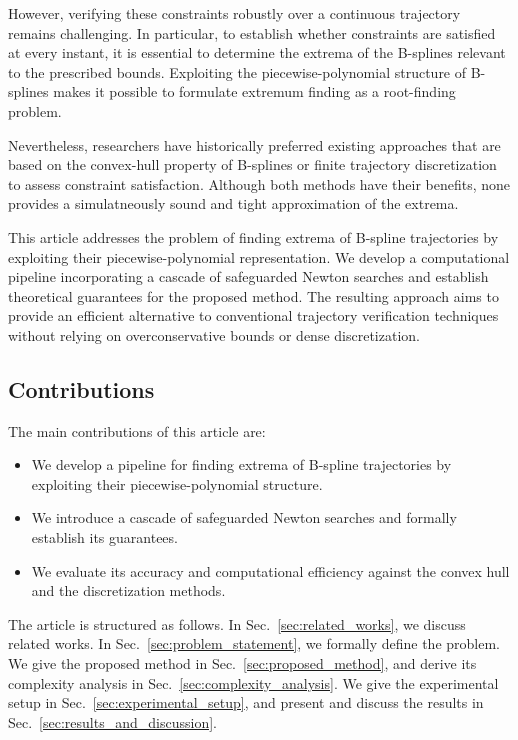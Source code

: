 \documentclass[final,5p,times,twocolumn]{elsarticle}
\theoremstyle{definition}
\begin{document}
However, verifying these constraints robustly over a continuous trajectory remains challenging. In particular, to establish whether constraints are satisfied at every instant, it is essential to determine the extrema of the B-splines relevant to the prescribed bounds. Exploiting the piecewise-polynomial structure of B-splines makes it possible to formulate extremum finding as a root-finding problem. 

Nevertheless, researchers have historically preferred existing approaches that are based on the convex-hull property of B-splines or finite trajectory discretization to assess constraint satisfaction. Although both methods have their benefits, none provides a simulatneously sound and tight approximation of the extrema.

This article addresses the problem of finding extrema of B-spline trajectories by exploiting their piecewise-polynomial representation. We develop a computational pipeline incorporating a cascade of safeguarded Newton searches and establish theoretical guarantees for the proposed method. The resulting approach aims to provide an efficient alternative to conventional trajectory verification techniques without relying on overconservative bounds or dense discretization.

\subsection{Contributions}

The main contributions of this article are:
\begin{itemize}
    \item We develop a pipeline for finding extrema of B-spline trajectories by exploiting their piecewise-polynomial structure.
    \item We introduce a cascade of safeguarded Newton searches and formally establish its guarantees.
    \item We evaluate its accuracy and computational efficiency against the convex hull and the discretization methods. 
\end{itemize}

The article is structured as follows. In Sec.~\ref{sec:related_works}, we discuss related works. In Sec.~\ref{sec:problem_statement}, we formally define the problem. We give the proposed method in Sec.~\ref{sec:proposed_method}, and derive its complexity analysis in Sec.~\ref{sec:complexity_analysis}. We give the experimental setup in Sec.~\ref{sec:experimental_setup}, and present and discuss the results in Sec.~\ref{sec:results_and_discussion}. 
\end{document}
